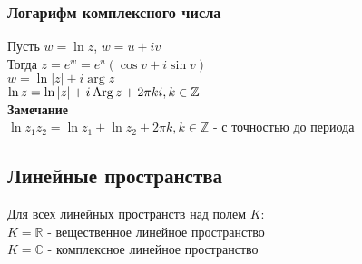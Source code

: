 \documentclass[12pt]{article}
\begin{document}
\subsubsection{Логарифм комплексного числа}
Пусть $w = \ln z$, $w = u + iv$\\
Тогда $z = e^w = e^u (\cos v + i \sin v)$\\
$w = \ln |z| + i\arg z$\\
$\ln z = \ln |z| + i\operatorname{Arg} z + 2\pi ki, k \in \mathbb{Z}$\\
\textbf{Замечание}\\
$\ln z_1z_2 = \ln z_1 + \ln z_2 + 2\pi k, k \in \mathbb{Z}$ - с точностью до периода
\subsection{Линейные пространства}
Для всех линейных пространств над полем $K$:\\
$K = \mathbb{R}$ - вещественное линейное пространство\\
$K = \mathbb{C}$ - комплексное линейное пространство\\
\end{document}

